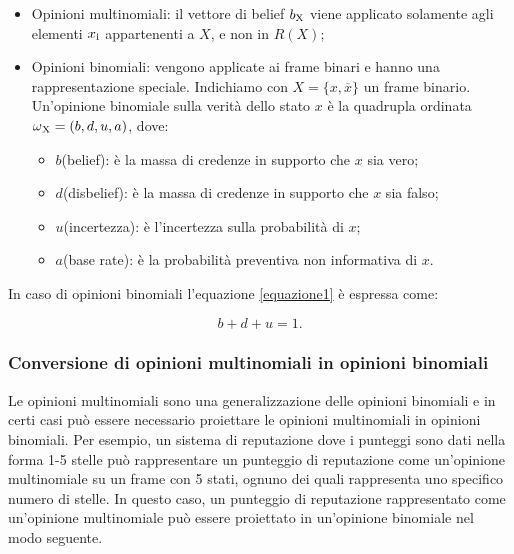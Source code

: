 \documentclass[letterpaper]{article} %
\begin{document}
\begin{itemize}
	\item
	Opinioni multinomiali: il vettore di belief $b\textsubscript{X}$ viene
	applicato solamente agli elementi $x\textsubscript{i}$ appartenenti a $X$, e non in $R(X)$;
	\item
	Opinioni binomiali: vengono applicate ai frame binari e hanno una
	rappresentazione speciale. Indichiamo con $X = \{x,\overline{x}\}$ un frame
	binario. Un'opinione binomiale sulla verità dello stato $x$ è la
	quadrupla ordinata $\omega\textsubscript{X}=(b,d,u,a)$, dove:
	
	\begin{itemize}
		\item
		$b$(belief): è la massa di credenze in supporto che $x$ sia vero;
		\item
		$d$(disbelief): è la massa di credenze in supporto che $x$ sia falso;
		\item
		$u$(incertezza): è l'incertezza sulla probabilità di $x$;
		\item
		$a$(base rate): è la probabilità preventiva non informativa di $x$.
	\end{itemize}
\end{itemize}

In caso di opinioni binomiali l'equazione \eqref{equazione1} è espressa come:
\begin{center}
	\begin{equation}
	b+d+u=1. \label{equazione3}
	\end{equation}
	
\end{center}

\subsubsection{Conversione di opinioni multinomiali in opinioni	binomiali}

Le opinioni multinomiali sono una generalizzazione delle opinioni
binomiali e in certi casi può essere necessario proiettare le opinioni
multinomiali in opinioni binomiali. Per esempio, un sistema di
reputazione dove i punteggi sono dati nella forma 1-5 stelle può
rappresentare un punteggio di reputazione come un'opinione multinomiale
su un frame con 5 stati, ognuno dei quali rappresenta uno specifico
numero di stelle. In questo caso, un punteggio di reputazione
rappresentato come un'opinione multinomiale può essere proiettato in
un'opinione binomiale nel modo seguente.
\end{document}
